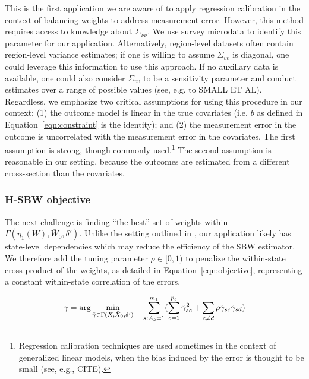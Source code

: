 \documentclass[aoas]{imsart}
\theoremstyle{plain}
\theoremstyle{remark}
\begin{document}
This is the first application we are aware of to apply regression calibration in the context of balancing weights to address measurement error. However, this method requires access to knowledge about $\Sigma_{\nu\nu}$. We use survey microdata to identify this parameter for our application. Alternatively, region-level datasets often contain region-level variance estimates; if one is willing to assume $\Sigma_{vv}$ is diagonal, one could leverage this information to use this approach. If no auxillary data is available, one could also consider $\Sigma_{vv}$ to be a sensitivity parameter and conduct estimates over a range of possible values (see, e.g. to SMALL ET AL). 
Regardless, we emphasize two critical assumptions for using this procedure in our context: (1) the outcome model is linear in the true covariates (i.e. $b$ as defined in Equation~\ref{eqn:constraint} is the identity); and (2) the measurement error in the outcome is uncorrelated with the measurement error in the covariates. The first assumption is strong, though commonly used.\footnote{Regression calibration techniques are used sometimes in the context of generalized linear models, when the bias induced by the error is thought to be small (see, e.g., CITE).} The second assumption is reasonable in our setting, because the outcomes are estimated from a different cross-section than the covariates. 

\subsubsection{H-SBW objective}\label{sssec:hsbw}

The next challenge is finding ``the best'' set of weights within $\Gamma(\eta_1(W), \bar{W}_0, \delta')$. Unlike the setting outlined in \cite{zubizarreta2015stable}, our application likely has state-level dependencies which may reduce the efficiency of the SBW estimator. We therefore add the tuning parameter $\rho \in [0, 1)$ to penalize the within-state cross product of the weights, as detailed in Equation~\ref{eqn:objective}, representing a constant within-state correlation of the errors.

\begin{equation}\label{eqn:objective}
\gamma = \arg\min_{\tilde{\gamma} \in \Gamma(X, \bar{X}_0, \delta')} \quad \sum_{s: A_s = 1}^{m_1}(\sum_{c = 1}^{p_s} \tilde{\gamma}_{sc}^2 + \sum_{c \ne d}\rho \tilde{\gamma}_{sc}\tilde{\gamma}_{sd})\\
\end{equation}
\end{document}

